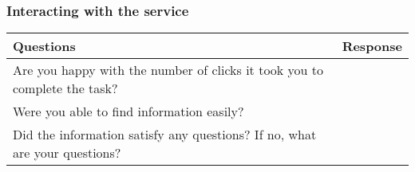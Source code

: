 \newpage
\subsubsection{Interacting with the service}

\begin{table}[h]
\centering
\renewcommand{\arraystretch}{1.5}
\begin{tabularx}{\textwidth}{|X|X|}
\hline
\textbf{Questions} & \textbf{Response} \\ \hline
Are you happy with the number of clicks it took you to complete the task? &  \\ \hline
Were you able to find information easily? &  \\ \hline
Did the information satisfy any questions? If no, what are your questions?\newline\newline &  \\ \hline
\end{tabularx}
\end{table}